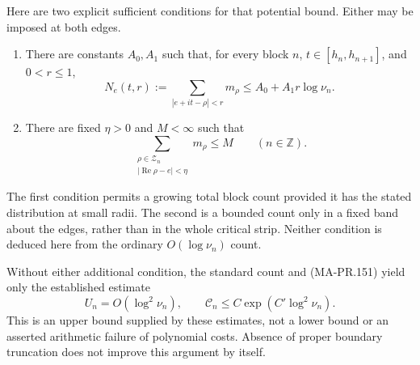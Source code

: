 Here are two explicit sufficient conditions for that
potential bound.  Either may be imposed at both edges.
\begin{enumerate}
\item There are constants \(A_0,A_1\) such that, for every
block \(n\), \(t\in[h_n,h_{n+1}]\), and \(0<r\le1\),
\[
 N_e(t,r):=\sum_{|e+it-\rho|<r}m_\rho
                   \le A_0+A_1r\log\nu_n .
 \tag{MA-PR.155}
\]
\item There are fixed \(\eta>0\) and \(M<\infty\) such that
\[
 \sum_{\substack{\rho\in\mathcal Z_n\\
                     |\operatorname{Re}\rho-e|<\eta}}
                         m_\rho\le M
                         \qquad(n\in\mathbb Z).
 \tag{MA-PR.156}
\]
\end{enumerate}
The first condition permits a growing total block count
provided it has the stated distribution at small radii.
The second is a bounded count only in a fixed band about
the edges, rather than in the whole critical strip.
Neither condition is deduced here from the ordinary
\(O(\log\nu_n)\) count.

Without either additional condition, the standard count
and (MA-PR.151) yield only the established estimate
\[
                U_n=O(\log^2\nu_n),\qquad
                \mathcal C_n\le C\exp(C'\log^2\nu_n).
 \tag{MA-PR.157}
\]
This is an upper bound supplied by these estimates,
not a lower bound or an asserted arithmetic failure of
polynomial costs.  Absence of proper boundary truncation
does not improve this argument by itself.


